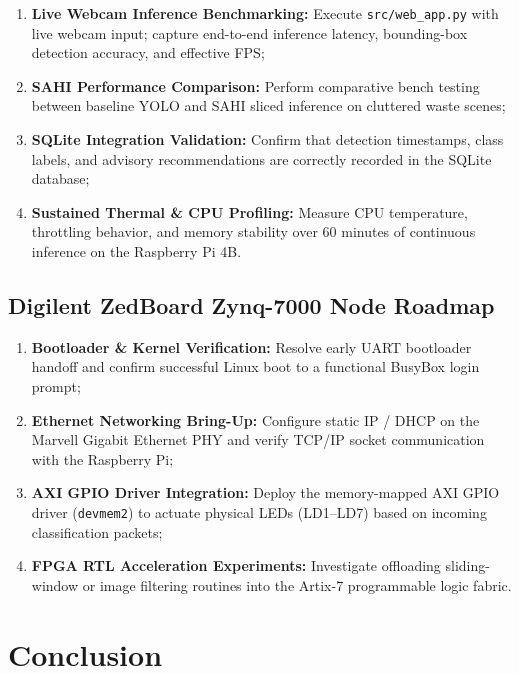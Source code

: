 \documentclass[12pt,a4paper]{article}
\begin{document}
\begin{enumerate}[label=\textbf{R\arabic*.}]
  \item \textbf{Live Webcam Inference Benchmarking:} Execute \texttt{src/web\_app.py} with live
  webcam input; capture end-to-end inference latency, bounding-box detection accuracy, and effective FPS;
  \item \textbf{SAHI Performance Comparison:} Perform comparative bench testing between baseline YOLO
  and SAHI sliced inference on cluttered waste scenes;
  \item \textbf{SQLite Integration Validation:} Confirm that detection timestamps, class labels, and
  advisory recommendations are correctly recorded in the SQLite database;
  \item \textbf{Sustained Thermal \& CPU Profiling:} Measure CPU temperature, throttling behavior,
  and memory stability over 60 minutes of continuous inference on the Raspberry Pi 4B.
\end{enumerate}

\subsection{Digilent ZedBoard Zynq-7000 Node Roadmap}

\begin{enumerate}[label=\textbf{Z\arabic*.}]
  \item \textbf{Bootloader \& Kernel Verification:} Resolve early UART bootloader handoff and confirm
  successful Linux boot to a functional BusyBox login prompt;
  \item \textbf{Ethernet Networking Bring-Up:} Configure static IP / DHCP on the Marvell Gigabit
  Ethernet PHY and verify TCP/IP socket communication with the Raspberry Pi;
  \item \textbf{AXI GPIO Driver Integration:} Deploy the memory-mapped AXI GPIO driver (\texttt{devmem2})
  to actuate physical LEDs (LD1--LD7) based on incoming classification packets;
  \item \textbf{FPGA RTL Acceleration Experiments:} Investigate offloading sliding-window or image
  filtering routines into the Artix-7 programmable logic fabric.
\end{enumerate}

\clearpage

\section{Conclusion}
\end{document}
